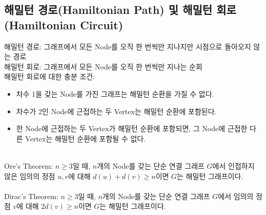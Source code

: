 \subsection{해밀턴 경로(Hamiltonian Path) 및 해밀턴 회로(Hamiltonian Circuit)}
해밀턴 경로: 그래프에서 모든 Node를 오직 한 번씩만 지나지만 시점으로 돌아오지 않는 경로\\
해밀턴 회로: 그래프에서 모든 Node를 오직 한 번씩만 지나는 순회\\
해밀턴 회로에 대한 충분 조건:
\begin{itemize}
    \item 차수 1을 갖는 Node를 가진 그래프는 해밀턴 순환을 가질 수 없다.
    \item 차수가 2인 Node에 근접하는 두 Vertex는 해밀턴 순환에 포함된다.
    \item 한 Node에 근접하는 두 Vertex가 해밀턴 순환에 포함되면, 그 Node에 근접한 다른 Vertex는 해밀턴 순환에 포함될 수 없다.
\end{itemize}\phantom{}\\
Ore's Theorem: $n \geq 3$일 때, $n$개의 Node를 갖는 단순 연결 그래프 $G$에서 인접하지 않은 임의의 정점 $u, v$에 대해 $d(u) + d(v) \geq n$이면 $G$는 해밀턴 그래프이다.\\\\
Dirac's Theorem: $n \geq 3$일 때, $n$개의 Node를 갖는 단순 연결 그래프 $G$에서 임의의 정점 $v$에 대해 $2d(v) \geq n$이면 $G$는 해밀턴 그래프이다.
\newpage
